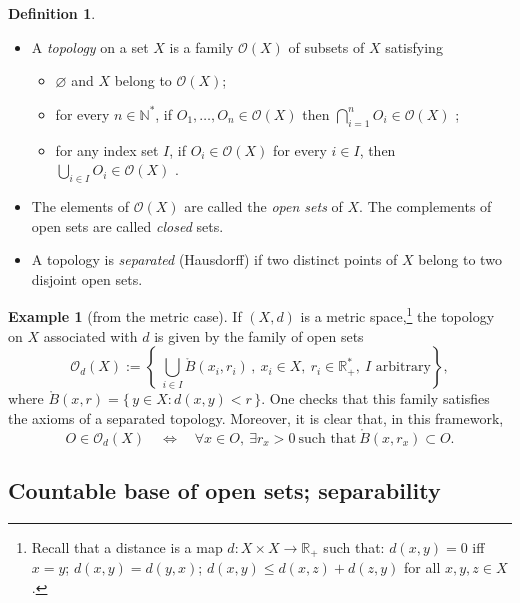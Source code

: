 \documentclass[12pt]{article}
\theoremstyle{definition}
\newtheorem{definition}{Definition}[section]
\newtheorem{example}{Example}[section]
\begin{document}
\begin{definition}
\begin{itemize}[leftmargin=1.5em]
\item[(a)] A \emph{topology} on a set $X$ is a family $\mathcal{O}(X)$ of subsets of $X$ satisfying
\begin{itemize}[leftmargin=1.2em]
\item[(i)] $\varnothing$ and $X$ belong to $\mathcal{O}(X)$;
\item[(ii)] for every $n\in\mathbb{N}^{\!*}$, if $O_1,\dots,O_n\in\mathcal{O}(X)$ then $\displaystyle \bigcap_{i=1}^n O_i\in\mathcal{O}(X)$ ;
\item[(iii)] for any index set $I$, if $O_i\in\mathcal{O}(X)$ for every $i\in I$, then $\displaystyle \bigcup_{i\in I} O_i\in\mathcal{O}(X)$ .
\end{itemize}
\item[(b)] The elements of $\mathcal{O}(X)$ are called the \emph{open sets} of $X$.
The complements of open sets are called \emph{closed} sets.
\item[(c)] A topology is \emph{separated} (Hausdorff) if two distinct points of $X$ belong to two disjoint open sets.
\end{itemize}
\end{definition}

\begin{example}[from the metric case]
If $(X,d)$ is a metric space,\footnote{Recall that a distance is a map $d:X\times X\to\mathbb{R}_+$ such that:
$d(x,y)=0$ iff $x=y$; $d(x,y)=d(y,x)$; $d(x,y)\le d(x,z)+d(z,y)$ for all $x,y,z\in X$.}
the topology on $X$ associated with $d$ is given by the family of open sets
\[
\mathcal{O}_d(X):=\left\{\ \bigcup_{i\in I} \mathring{B}(x_i,r_i)\,,\ x_i\in X,\ r_i\in\mathbb{R}_+^{\!*},\ I\text{ arbitrary}\right\},
\]
where $\mathring{B}(x,r)=\{\,y\in X: d(x,y)<r\,\}$.
One checks that this family satisfies the axioms of a separated topology.
Moreover, it is clear that, in this framework,
\[
O\in\mathcal{O}_d(X)\quad\Longleftrightarrow\quad
\forall x\in O,\ \exists r_x>0\ \text{such that}\ \mathring{B}(x,r_x)\subset O .
\]

\end{example}

\subsection{Countable base of open sets; separability}
\end{document}
